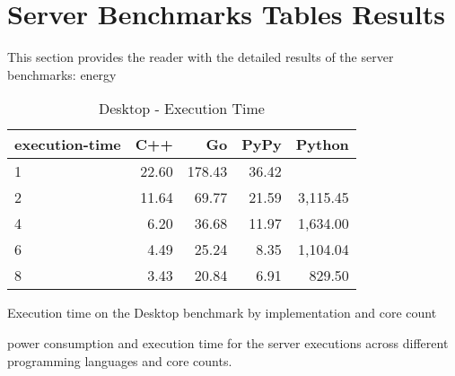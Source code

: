 
\chapter{Server Benchmarks Tables Results}

This section provides the reader with the detailed results of the server benchmarks: energy\begin{table}[H]
    \centering
    \begin{tabular}{lrrrr}
        \hline
        execution-time & C++                 & Go          & PyPy       & Python              \\
        \hline
        1              & 22.60               & 178.43      & 36.42      &                    \\
        2              & 11.64               & 69.77       & 21.59      & 3,115.45           \\
        4              & 6.20                & 36.68       & 11.97      & 1,634.00           \\
        6              & 4.49                & 25.24       & 8.35       & 1,104.04           \\
        8	           & 3.43                & 20.84       & 6.91       & 829.50             \\
        \hline
    \end{tabular}
\caption{Desktop - Execution Time}{Execution time on the Desktop benchmark by implementation and core count}
\label{tab:desktop-execution-time}
\end{table}power consumption and execution time for the server executions across different programming languages and core counts.

